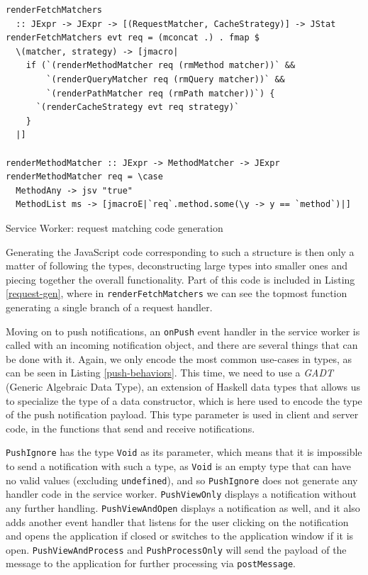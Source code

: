 \documentclass[english,zadani,odsaz]{fitthesis}
\begin{document}
\begin{listing}[tb]
\begin{verbatim}
renderFetchMatchers
  :: JExpr -> JExpr -> [(RequestMatcher, CacheStrategy)] -> JStat
renderFetchMatchers evt req = (mconcat .) . fmap $
  \(matcher, strategy) -> [jmacro|
    if (`(renderMethodMatcher req (rmMethod matcher))` &&
        `(renderQueryMatcher req (rmQuery matcher))` &&
        `(renderPathMatcher req (rmPath matcher))`) {
      `(renderCacheStrategy evt req strategy)`
    }
  |]

renderMethodMatcher :: JExpr -> MethodMatcher -> JExpr
renderMethodMatcher req = \case
  MethodAny -> jsv "true"
  MethodList ms -> [jmacroE|`req`.method.some(\y -> y == `method`)|]
\end{verbatim}
\caption{Service Worker: request matching code generation \label{request-gen}}
\end{listing}

Generating the JavaScript code corresponding to such a structure is then only a
matter of following the types, deconstructing large types into smaller ones and
piecing together the overall functionality. Part of this code is included in
Listing \ref{request-gen}, where in \texttt{renderFetchMatchers} we can see the topmost
function generating a single branch of a request handler.

Moving on to push notifications, an \texttt{onPush} event handler in the service worker
is called with an incoming notification object, and there are several things
that can be done with it. Again, we only encode the most common use-cases in
types, as can be seen in Listing \ref{push-behaviors}. This time, we need to use a
\emph{GADT} (Generic Algebraic Data Type), an extension of Haskell data types that
allows us to specialize the type of a data constructor, which is here used to
encode the type of the push notification payload. This type parameter is used in
client and server code, in the functions that send and receive notifications.

\texttt{PushIgnore} has the type \texttt{Void} as its parameter, which means that it is impossible
to send a notification with such a type, as \texttt{Void} is an empty type that can have
no valid values (excluding \texttt{undefined}), and so \texttt{PushIgnore} does not generate any
handler code in the service worker. \texttt{PushViewOnly} displays a notification without
any further handling. \texttt{PushViewAndOpen} displays a notification as well, and it
also adds another event handler that listens for the user clicking on the
notification and opens the application if closed or switches to the application
window if it is open. \texttt{PushViewAndProcess} and \texttt{PushProcessOnly} will send the
payload of the message to the application  for further processing via
\texttt{postMessage}.
\end{document}
